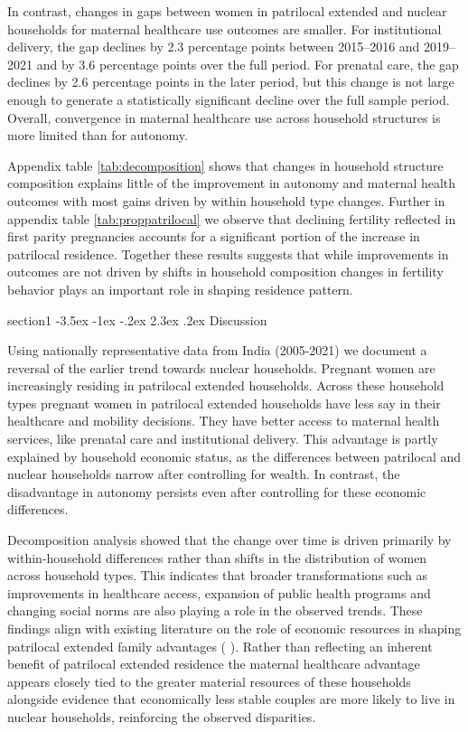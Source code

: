 \documentclass[12pt]{article}
\makeatletter
\renewcommand\section{\@startsection
{section}{1}{\z@}
{-3.5ex \@plus -1ex \@minus -.2ex}
{2.3ex \@plus.2ex}
{\centering\normalfont\Large\bfseries}}
\makeatother
\begin{document}
In contrast, changes in gaps between women in patrilocal extended and nuclear households for maternal healthcare use outcomes are smaller. For institutional delivery, the gap declines by 2.3 percentage points between 2015–2016 and 2019–2021 and by 3.6 percentage points over the full period. For prenatal care, the gap declines by 2.6 percentage points in the later period, but this change is not large enough to generate a statistically significant decline over the full sample period. Overall, convergence in maternal healthcare use across household structures is more limited than for autonomy. 

Appendix table \ref{tab:decomposition} shows that changes in household structure  composition explains little of the improvement in autonomy and maternal health outcomes with most gains driven by within household type changes. Further in appendix table \ref{tab:proppatrilocal} we observe that declining fertility reflected in first parity pregnancies accounts for a significant portion of the increase in patrilocal residence. Together these results suggests that while improvements in outcomes are not driven by shifts in household composition changes in fertility behavior plays an important role in shaping residence pattern.
 
\section{Discussion}

Using nationally representative data from India (2005-2021) we document a reversal of the earlier trend towards nuclear households. Pregnant women are increasingly residing in patrilocal extended households. Across these household types pregnant women in patrilocal extended households have less say in their healthcare and mobility decisions. They have better access to maternal health services, like prenatal care and institutional delivery.  This advantage is partly explained by household economic status, as the differences between patrilocal and nuclear households narrow after controlling for wealth. In contrast, the disadvantage in autonomy persists even after controlling for these economic differences.

Decomposition analysis showed that the change over time is driven primarily by within-household differences rather than shifts in the distribution of women across household types. This indicates that broader transformations such as improvements in healthcare access, expansion of public health programs and changing social norms are also playing a role in the observed trends. These findings align with existing literature on the role of economic resources in shaping patrilocal extended family advantages (\cite{allendorf2013going} \cite{breton2021modernisation}). Rather than reflecting an inherent benefit of patrilocal extended residence the maternal healthcare advantage appears closely tied to the greater material resources of these households alongside evidence that economically less stable couples are more likely to live in nuclear households, reinforcing the observed disparities.
\end{document}
